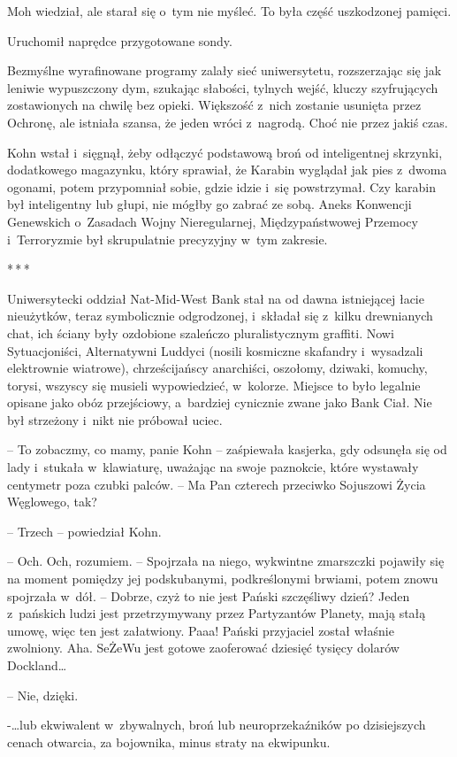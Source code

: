 \documentclass[oneside,polish,11pt,sfheadings]{mwbk}
\newcommand{\threeast}{\bigskip\par\centerline{*\,*\,*}\medskip\par}%
\begin{document}
Moh wiedział, ale starał się o~tym nie myśleć. To była część uszkodzonej
pamięci.

Uruchomił naprędce przygotowane sondy.

Bezmyślne wyrafinowane programy zalały sieć uniwersytetu, rozszerzając
się jak leniwie wypuszczony dym, szukając słabości, tylnych wejść,
kluczy szyfrujących zostawionych na chwilę bez opieki. Większość z~nich
zostanie usunięta przez Ochronę, ale istniała szansa, że jeden wróci z~nagrodą. Choć nie przez jakiś czas.

Kohn wstał i~sięgnął, żeby odłączyć podstawową broń od inteligentnej
skrzynki, dodatkowego magazynku, który sprawiał, że Karabin wyglądał jak
pies z~dwoma ogonami, potem przypomniał sobie, gdzie idzie i~się
powstrzymał. Czy karabin był inteligentny lub głupi, nie mógłby go
zabrać ze sobą. Aneks Konwencji Genewskich o~Zasadach Wojny
Nieregularnej, Międzypaństwowej Przemocy i~Terroryzmie był skrupulatnie
precyzyjny w~tym zakresie.
  \threeast 

Uniwersytecki oddział Nat-Mid-West Bank stał na od dawna istniejącej
łacie nieużytków, teraz symbolicznie odgrodzonej, i~składał się z~kilku
drewnianych chat, ich ściany były ozdobione szaleńczo pluralistycznym
graffiti. Nowi Sytuacjoniści, Alternatywni Luddyci (nosili kosmiczne
skafandry i~wysadzali elektrownie wiatrowe), chrześcijańscy anarchiści,
oszołomy, dziwaki, komuchy, torysi, wszyscy się musieli wypowiedzieć, w~kolorze. Miejsce to było legalnie opisane jako obóz przejściowy, a~bardziej cynicznie zwane jako Bank Ciał. Nie był strzeżony i~nikt nie
próbował uciec.

-- To zobaczmy, co mamy, panie Kohn -- zaśpiewała kasjerka, gdy odsunęła
się od lady i~stukała w~klawiaturę, uważając na swoje paznokcie, które
wystawały centymetr poza czubki palców. -- Ma Pan czterech przeciwko
Sojuszowi Życia Węglowego, tak?

-- Trzech -- powiedział Kohn.

-- Och. Och, rozumiem. -- Spojrzała na niego, wykwintne zmarszczki
pojawiły się na moment pomiędzy jej podskubanymi, podkreślonymi brwiami,
potem znowu spojrzała w~dół. -- Dobrze, czyż to nie jest Pański
szczęśliwy dzień? Jeden z~pańskich ludzi jest przetrzymywany przez
Partyzantów Planety, mają stałą umowę, więc ten jest załatwiony. Paaa!
Pański przyjaciel został właśnie zwolniony. Aha. SeŻeWu jest gotowe
zaoferować dziesięć tysięcy dolarów Dockland\ldots

-- Nie, dzięki.

-\ldots lub ekwiwalent w~zbywalnych, broń lub neuroprzekaźników po
dzisiejszych cenach otwarcia, za bojownika, minus straty na ekwipunku.
\end{document}
